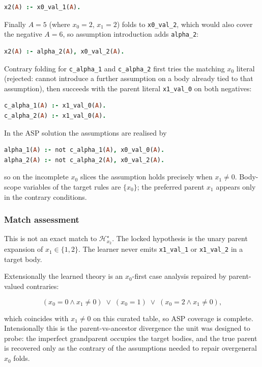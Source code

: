 \documentclass[11pt]{article}
\begin{document}
\begin{lstlisting}[style=logic,language=Prolog]
x2(A) :- x0_val_1(A).
\end{lstlisting}

Finally \(A=5\) (where \(x_0=2\), \(x_1=2\)) folds to \texttt{x0\_val\_2}, which would also cover the negative \(A=6\), so assumption introduction adds \texttt{alpha\_2}:

\begin{lstlisting}[style=logic,language=Prolog]
x2(A) :- alpha_2(A), x0_val_2(A).
\end{lstlisting}

Contrary folding for \texttt{c\_alpha\_1} and \texttt{c\_alpha\_2} first tries the matching \(x_0\) literal (rejected: cannot introduce a further assumption on a body already tied to that assumption), then succeeds with the parent literal \texttt{x1\_val\_0} on both negatives:

\begin{lstlisting}[style=logic,language=Prolog]
c_alpha_1(A) :- x1_val_0(A).
c_alpha_2(A) :- x1_val_0(A).
\end{lstlisting}

In the ASP solution the assumptions are realised by

\begin{lstlisting}[style=logic,language=Prolog]
alpha_1(A) :- not c_alpha_1(A), x0_val_0(A).
alpha_2(A) :- not c_alpha_2(A), x0_val_2(A).
\end{lstlisting}

so on the incomplete \(x_0\) slices the assumption holds precisely when \(x_1\neq 0\). Body-scope variables of the target rules are \(\{x_0\}\); the preferred parent \(x_1\) appears only in the contrary conditions.

\subsubsection{Match assessment}

This is not an exact match to \(\mathcal{H}_{x_2}^\star\). The locked hypothesis is the unary parent expansion of \(x_1\in\{1,2\}\). The learner never emits \texttt{x1\_val\_1} or \texttt{x1\_val\_2} in a target body.

Extensionally the learned theory is an \(x_0\)-first case analysis repaired by parent-valued contraries:

\[ (x_0=0 \land x_1\neq 0)\;\lor\;(x_0=1)\;\lor\;(x_0=2 \land x_1\neq 0), \]

which coincides with \(x_1\neq 0\) on this curated table, so ASP coverage is complete. Intensionally this is the parent-vs-ancestor divergence the unit was designed to probe: the imperfect grandparent occupies the target bodies, and the true parent is recovered only as the contrary of the assumptions needed to repair overgeneral \(x_0\) folds.
\end{document}
